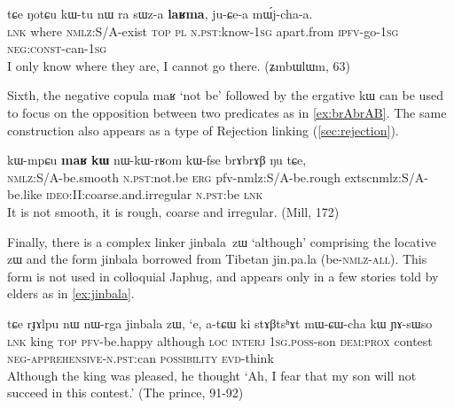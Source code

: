 \documentclass[oldfontcommands,oneside,a4paper,11pt]{article}
\newcommand{\ipa}[1]{{\phon \mbox{#1}}} %
\begin{document}
 \begin{exe}
\ex \label{ex:sWza.laRma}
\gll
 \ipa{tɕe}  	\ipa{ŋotɕu}  	\ipa{kɯ-tu}  	\ipa{nɯ} \ipa{ra}  	\ipa{sɯz-a}  	\ipa{\textbf{laʁma},}  	\ipa{ju-ɕe-a}  	\ipa{mɯ́j-cha-a.}  	\\
 \textsc{lnk} where \textsc{nmlz}:S/A-exist \textsc{top} \textsc{pl} \textsc{n.pst}:know-\textsc{1sg} apart.from \textsc{ipfv}-go-\textsc{1sg} \textsc{neg:const}-can-\textsc{1sg}\\
\glt I only know where they are, I cannot go there. (ʑmbɯlɯm, 63)
\end{exe}
Sixth, the negative copula \ipa{maʁ}  `not be' followed by the ergative \ipa{kɯ} can be used to focus on the opposition between two predicates as in \ref{ex:brAbrAB}. The same construction also appears as a type of Rejection linking (\ref{sec:rejection}).
\begin{exe}
\ex \label{ex:brAbrAB}
\gll
\ipa{kɯ-mpɕu}  	\ipa{\textbf{maʁ}}  	\ipa{\textbf{kɯ}}  	\ipa{nɯ-kɯ-rʁom}  	\ipa{kɯ-fse}  	\ipa{brɤbrɤβ}  	\ipa{ŋu}  	\ipa{tɕe,}  \\
\textsc{nmlz:S/A}-be.smooth \textsc{n.pst}:not.be \textsc{erg}   {pfv-nmlz:S/A}-be.rough extsc{nmlz:S/A}-be.like \textsc{ideo}:II:coarse.and.irregular \textsc{n.pst}:be  \textsc{lnk} \\
\glt It is not smooth, it is rough, coarse and irregular. (Mill, 172)
\end{exe}

Finally, there is a complex linker \ipa{jinbala zɯ} `although' comprising the locative \ipa{zɯ} and the form \ipa{jinbala} borrowed from Tibetan \ipa{jin.pa.la} (be-\textsc{nmlz-all}). This form is not used in colloquial Japhug, and appears only in a few stories told by elders as in \ref{ex:jinbala}.

\begin{exe}
\ex \label{ex:jinbala}
\gll 
\ipa{tɕe}  	\ipa{rɟɤlpu}  	\ipa{nɯ}  	\ipa{nɯ-rga}  	\ipa{jinbala}  	\ipa{zɯ,}  	\ipa{`e,}  	\ipa{a-tɕɯ}  	\ipa{ki}  	\ipa{stɤβtsʰɤt}  	\ipa{mɯ-ɕɯ-cha}  	\ipa{kɯ}  	\ipa{ɲɤ-sɯso}  \\
\textsc{lnk} king \textsc{top} \textsc{pfv}-be.happy although \textsc{loc} \textsc{interj} \textsc{1sg.poss}-son \textsc{dem:prox} contest \textsc{neg-apprehensive-n.pst}:can \textsc{possibility} \textsc{evd}-think \\
\glt Although the king was pleased, he thought `Ah, I fear that my son will not succeed in this contest.' (The prince, 91-92)
 \end{exe}
\end{document}
